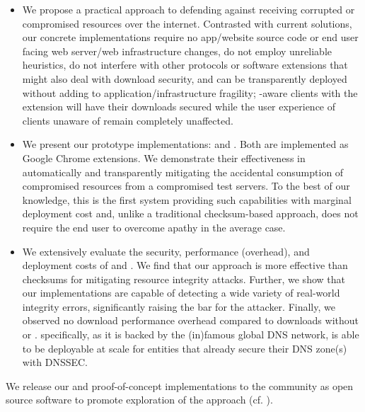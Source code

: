 \begin{itemize}

  \item We propose a practical approach to defending against receiving corrupted
  or compromised resources over the internet. Contrasted with current solutions,
  our concrete implementations require no app/website source code or end user
  facing web server/web infrastructure changes, do not employ unreliable
  heuristics, do not interfere with other protocols or software extensions that
  might also deal with download security, and can be transparently deployed
  without adding to application/infrastructure fragility; \eg \SYSTEM{}-aware
  clients with the extension will have their downloads secured while the user
  experience of clients unaware of \SYSTEM{} remain completely unaffected.

  \item We present our prototype \SYSTEM{} implementations: \DNSSYS{} and
  \DHTSYS{}. Both are implemented as Google Chrome extensions. We demonstrate
  their effectiveness in automatically and transparently mitigating the
  accidental consumption of compromised resources from a compromised test
  servers. To the best of our knowledge, this is the first system providing such
  capabilities with marginal deployment cost and, unlike a traditional
  checksum-based approach, does not require the end user to overcome apathy in
  the average case.

  \item We extensively evaluate the security, performance (overhead), and
  deployment costs of \DNSSYS{} and \DHTSYS{}. We find that our approach is more
  effective than checksums for mitigating resource integrity attacks. Further,
  we show that our implementations are capable of detecting a wide variety of
  real-world integrity errors, significantly raising the bar for the attacker.
  Finally, we observed no download performance overhead compared to downloads
  without \DNSSYS{} or \DHTSYS{}. \DNSSYS{} specifically, as it is backed by the
  (in)famous global DNS network, is able to be deployable at scale for entities
  that already secure their DNS zone(s) with DNSSEC.

\end{itemize}

We release our \DNSSYS{} and \DHTSYS{} proof-of-concept implementations to the
community as open source software to promote exploration of the \SYSTEM{}
approach (cf. ).
